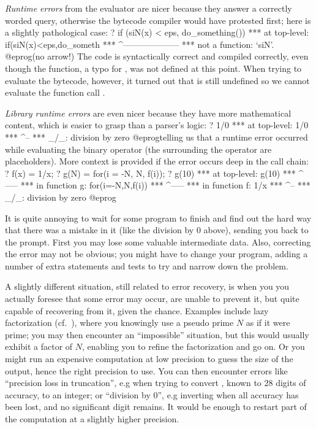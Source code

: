 \emph{Runtime errors} from the evaluator are nicer because they answer a
correctly worded query, otherwise the bytecode compiler would have protested
first; here is a slightly pathological case:
\bprog
? if (siN(x) < eps, do_something())
  ***   at top-level: if(siN(x)<eps,do_someth
  ***                    ^--------------------
  ***   not a function: `siN'.
@eprog\noindent (no arrow!) The code is syntactically correct and compiled
correctly, even though the  function, a typo for , was not
defined at this point. When trying to evaluate the bytecode, however, it
turned out that  is still undefined so we cannot evaluate the
function call .

\emph{Library runtime errors} are even nicer because they have more
mathematical content, which is easier to grasp than a parser's logic:
\bprog
? 1/0
  ***   at top-level: 1/0
  ***                  ^--
  *** _/_: division by zero
@eprog\noindent telling us that a runtime error occurred while evaluating the
binary \kbd{/} operator (the \kbd{\_} surrounding the operator are
placeholders). More context is provided if the error occurs deep in the
call chain:
\bprog
? f(x) = 1/x;
? g(N) = for(i = -N, N, f(i));
? g(10)
  ***   at top-level: g(10)
  ***                 ^-----
  ***   in function g: for(i=-N,N,f(i))
  ***                             ^-----
  ***   in function f: 1/x
  ***                   ^--
  *** _/_: division by zero
@eprog

\label{se:errorrec}

It is quite annoying to wait for some program to finish and find out the hard
way that there was a mistake in it (like the division by 0 above), sending
you back to the prompt. First you may lose some valuable intermediate data.
Also, correcting the error may not be obvious; you might have to change your
program, adding a number of extra statements and tests to try and narrow down
the problem.

A slightly different situation, still related to error recovery, is when you
you actually foresee that some error may occur, are unable to prevent it, but
quite capable of recovering from it, given the chance. Examples include lazy
factorization (cf.~), where you knowingly use a pseudo prime
$N$ as if it were prime; you may then encounter an ``impossible'' situation,
but this would usually exhibit a factor of $N$, enabling you to refine the
factorization and go on. Or you might run an expensive computation at low
precision to guess the size of the output, hence the right precision to use.
You can then encounter errors like ``precision loss in truncation'', e.g when
trying to convert , known to $28$ digits of accuracy, to an
integer; or ``division by 0'', e.g inverting  when all accuracy
has been lost, and no significant digit remains. It would be enough to
restart part of the computation at a slightly higher precision.

